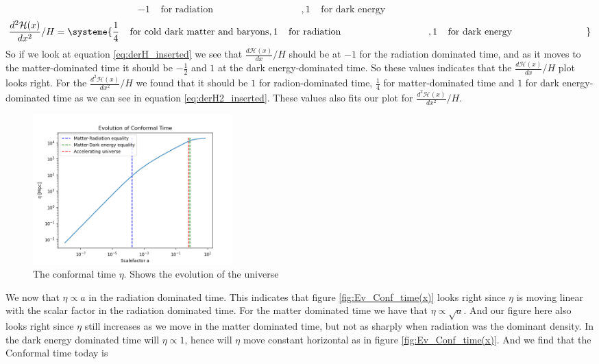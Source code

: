 \documentclass{article}
\begin{document}
\begin{multicols}{2}
\begin{equation}
{  -1\;\;\;\; \text{for radiation} \;\;\;\;\;\;\;\;\;\;\;\;\;\;\;\;\;\;\;\;\;\;\;\;\;\;\;\;\;\;\;\;\;,
  1\;\;\;\; \text{for dark energy}\;\;\;\;\;\;\;\;\;\;\;\;\;\;\;\;\;\;\;\;\;\;\;\;\;\;\;\;\;
} \label{eq:derH_inserted}
\end{equation}
\begin{equation}
\frac{d^2\mathcal{H}(x)}{dx^2}/H=
\systeme{
  \frac{1}{4}\;\;\;\; \text{for cold dark matter and baryons},
  1\;\;\;\; \text{for radiation} \;\;\;\;\;\;\;\;\;\;\;\;\;\;\;\;\;\;\;\;\;\;\;\;\;\;\;\;\;\;\;\;\;,
  1\;\;\;\; \text{for dark energy}\;\;\;\;\;\;\;\;\;\;\;\;\;\;\;\;\;\;\;\;\;\;\;\;\;\;\;\;
} \label{eq:derH2_inserted}
\end{equation}
So if we look at equation \eqref{eq:derH_inserted} we see that $\frac{d\mathcal{H}(x)}{dx}/H$ should be at $-1$ for the radiation dominated time, and as it moves to the matter-dominated time it should be $-\frac{1}{2}$ and $1$ at the dark energy-dominated time. So these values indicates that the $\frac{d\mathcal{H}(x)}{dx}/H$ plot looks right. For the $\frac{d^2\mathcal{H}(x)}{dx^2}/H$ we found that it should be $1$ for radion-dominated time, $\frac{1}{4}$ for matter-dominated time and $1$ for dark energy-dominated time as we can see in equation \eqref{eq:derH2_inserted}. These values also fits our plot for $\frac{d^2\mathcal{H}(x)}{dx^2}/H$.  
\begin{figure}[H]
	\centering
	\includegraphics[width=77mm]{Evolution of Conformal Time.png}
	\caption{The conformal time $\eta$. Shows the evolution of the universe}
	\label{fig:Ev_Conf_time(x)}
\end{figure}
We now that $\eta \propto a$ in the radiation dominated time. This indicates that figure \eqref{fig:Ev_Conf_time(x)} looks right since $\eta$ is moving linear with the scalar factor in the radiation dominated time. For the matter dominated time we have that $\eta\propto \sqrt{a}$. And our figure here also looks right since $\eta$ still increases as we move in the matter dominated time, but not as sharply when radiation was the dominant density. In the dark energy dominated time will $\eta \propto 1$, hence will $\eta$ move constant horizontal as in figure \eqref{fig:Ev_Conf_time(x)}. And we find that the Conformal time today is 

\end{multicols}
\end{document}
